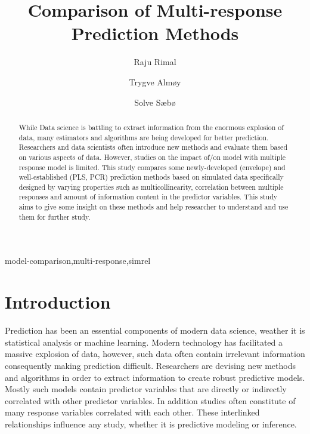 \documentclass[12pt,3p,authoryear]{elsarticle}
\begin{document}
\begin{frontmatter}

  \title{Comparison of Multi-response Prediction Methods}
  
    \author[KBM]{Raju Rimal}
    \author[KBM]{Trygve Almøy}
  
    \author[NMBU]{Solve Sæbø}
  
      \address[KBM]{Faculty of Chemistry and Bioinformatics, Norwegian University of Life
Sciences, Ås, Norway}
    \address[NMBU]{Prorector, Norwegian University of Life Sciences, Ås, Norway}
  
  \begin{abstract}
  While Data science is battling to extract information from the enormous
  explosion of data, many estimators and algorithms are being developed
  for better prediction. Researchers and data scientists often introduce
  new methods and evaluate them based on various aspects of data. However,
  studies on the impact of/on model with multiple response model is
  limited. This study compares some newly-developed (envelope) and
  well-established (PLS, PCR) prediction methods based on simulated data
  specifically designed by varying properties such as multicollinearity,
  correlation between multiple responses and amount of information content
  in the predictor variables. This study aims to give some insight on
  these methods and help researcher to understand and use them for further
  study.
  \end{abstract}
   \begin{keyword} model-comparison,multi-response,simrel\end{keyword}

\end{frontmatter}

\section{Introduction}\label{introduction}

Prediction has been an essential components of modern data science,
weather it is statistical analysis or machine learning. Modern
technology has facilitated a massive explosion of data, however, such
data often contain irrelevant information consequently making prediction
difficult. Researchers are devising new methods and algorithms in order
to extract information to create robust predictive models. Mostly such
models contain predictor variables that are directly or indirectly
correlated with other predictor variables. In addition studies often
constitute of many response variables correlated with each other. These
interlinked relationships influence any study, whether it is predictive
modeling or inference.
\end{document}
